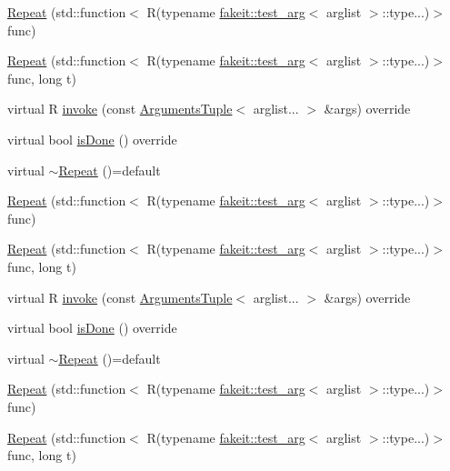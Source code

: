 \begin{DoxyCompactItemize}
\item 
\mbox{\hyperlink{structfakeit_1_1Repeat_aee6893820759d2b0fa05975cdbac7e8c}{Repeat}} (std\+::function$<$ R(typename \mbox{\hyperlink{structfakeit_1_1test__arg}{fakeit\+::test\+\_\+arg}}$<$ arglist $>$\+::type...)$>$ func)
\item 
\mbox{\hyperlink{structfakeit_1_1Repeat_a3907a7a5430a75e296424f89c09b5eee}{Repeat}} (std\+::function$<$ R(typename \mbox{\hyperlink{structfakeit_1_1test__arg}{fakeit\+::test\+\_\+arg}}$<$ arglist $>$\+::type...)$>$ func, long t)
\item 
virtual R \mbox{\hyperlink{structfakeit_1_1Repeat_a64e8c3a413edce162acaec724e832e19}{invoke}} (const \mbox{\hyperlink{namespacefakeit_a476a37a598825e1b5dd67b3a176491a1}{Arguments\+Tuple}}$<$ arglist... $>$ \&args) override
\item 
virtual bool \mbox{\hyperlink{structfakeit_1_1Repeat_a4822600fad5bce408fcd03d71ff333eb}{is\+Done}} () override
\item 
virtual \mbox{\hyperlink{structfakeit_1_1Repeat_a48edc25e2509018e7cc632fcf18eea42}{$\sim$\+Repeat}} ()=default
\item 
\mbox{\hyperlink{structfakeit_1_1Repeat_aee6893820759d2b0fa05975cdbac7e8c}{Repeat}} (std\+::function$<$ R(typename \mbox{\hyperlink{structfakeit_1_1test__arg}{fakeit\+::test\+\_\+arg}}$<$ arglist $>$\+::type...)$>$ func)
\item 
\mbox{\hyperlink{structfakeit_1_1Repeat_a3907a7a5430a75e296424f89c09b5eee}{Repeat}} (std\+::function$<$ R(typename \mbox{\hyperlink{structfakeit_1_1test__arg}{fakeit\+::test\+\_\+arg}}$<$ arglist $>$\+::type...)$>$ func, long t)
\item 
virtual R \mbox{\hyperlink{structfakeit_1_1Repeat_a64e8c3a413edce162acaec724e832e19}{invoke}} (const \mbox{\hyperlink{namespacefakeit_a476a37a598825e1b5dd67b3a176491a1}{Arguments\+Tuple}}$<$ arglist... $>$ \&args) override
\item 
virtual bool \mbox{\hyperlink{structfakeit_1_1Repeat_a4822600fad5bce408fcd03d71ff333eb}{is\+Done}} () override
\item 
virtual \mbox{\hyperlink{structfakeit_1_1Repeat_a48edc25e2509018e7cc632fcf18eea42}{$\sim$\+Repeat}} ()=default
\item 
\mbox{\hyperlink{structfakeit_1_1Repeat_aee6893820759d2b0fa05975cdbac7e8c}{Repeat}} (std\+::function$<$ R(typename \mbox{\hyperlink{structfakeit_1_1test__arg}{fakeit\+::test\+\_\+arg}}$<$ arglist $>$\+::type...)$>$ func)
\item 
\mbox{\hyperlink{structfakeit_1_1Repeat_a3907a7a5430a75e296424f89c09b5eee}{Repeat}} (std\+::function$<$ R(typename \mbox{\hyperlink{structfakeit_1_1test__arg}{fakeit\+::test\+\_\+arg}}$<$ arglist $>$\+::type...)$>$ func, long t)

\end{DoxyCompactItemize}

